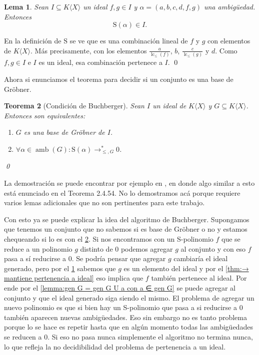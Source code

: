 \documentclass[12pt]{report}
\theoremstyle{customstyle}
\newtheorem{theorem}{Teorema}[chapter]
\newtheorem{lemma}[theorem]{Lema}
\renewenvironment{proof}[1][\proofname]{{\noindent \bfseries #1: }}{\qed} %
\theoremstyle{factstyle}
\DeclareMathOperator{\lc}{lc}
\DeclareMathOperator{\amb}{amb}
\renewcommand{\S}{\text{S}}
\begin{document}
\begin{lemma}\label{lemma:S es cerrado en ideal}
  Sean $I ⊆ K⟨X⟩$ un ideal $f, g ∈ I$ y $α = (a, b, c, d, f, g)$ una ambigüedad. Entonces
  \[ \S(α) ∈ I \text{.}\]
\end{lemma}
\begin{proof}
  En la definición de $\S$ se ve que es una combinación lineal de $f$ y $g$ con elementos de $K⟨X⟩$. Más precisamente, con los elementos $\frac{a}{\lc_≤{(f)}}$, $b$, $\frac{c}{\lc_≤{(g)}}$ y $d$. Como $f, g ∈ I$ e $I$ es un ideal, esa combinación pertenece a $I$.
\end{proof}

Ahora si enunciamos el teorema para decidir si un conjunto es una base de Gröbner.

\begin{theorem}[Condición de Buchberger]\label{thm:condición de Buchberger}
  Sean $I$ un ideal de $K⟨X⟩$ y $G ⊆ K⟨X⟩$. Entonces son equivalentes:
  \begin{enumerate}
    \item $G$ es una base de Gröbner de $I$.
    \item $∀α ∈ \amb(G) : \S(α) →^*_{≤, G} 0$.
  \end{enumerate}
  \qed
\end{theorem}

La demostración se puede encontrar por ejemplo en \cite{phdthesis:Hof23}, en donde algo similar a esto está enunciado en el Teorema 2.4.54. No lo demostramos acá porque requiere varios lemas adicionales que no son pertinentes para este trabajo.

Con esto ya se puede explicar la idea del algoritmo de Buchberger. Supongamos que tenemos un conjunto que no sabemos si es base de Gröbner o no y estamos chequeando si lo es con el \cref{thm:condición de Buchberger}. Si nos encontramos con un S-polinomio $f$ que se reduce a un polinomio $g$ distinto de $0$ podemos agregar $g$ al conjunto y con eso $f$ pasa a sí reducirse a $0$. Se podría pensar que agregar $g$ cambiaría el ideal generado, pero por el \cref{lemma:S es cerrado en ideal} sabemos que $g$ es un elemento del ideal y por el \cref{thm:→ mantiene pertenencia a ideal} eso implica que $f$ también pertenece al ideal. Por ende por el \cref{lemma:gen G = gen G U a con a ∈ gen G} se puede agregar al conjunto y que el ideal generado siga siendo el mismo. El problema de agregar un nuevo polinomio es que si bien hay un S-polinomio que pasa a si reducirse a $0$ también aparecen nuevas ambigüedades. Eso sin embargo no es tanto problema porque lo se hace es repetir hasta que en algún momento todas las ambigüedades se reducen a $0$. Si eso no pasa nunca simplemente el algoritmo no termina nunca, lo que refleja la no decidibilidad del problema de pertenencia a un ideal.
\end{document}
